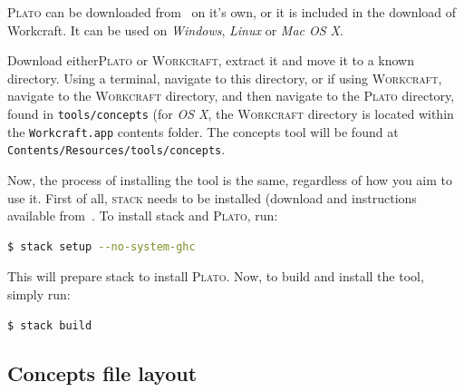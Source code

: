\documentclass[british,conference,compsoc]{IEEEtran}
\newcommand{\noun}[1]{\textsc{#1}}
\begin{document}
\noun{Plato} can be downloaded from~\cite{2016_concepts_github} on it's
own, or it is included in the download of Workcraft. It can be used on 
\emph{Windows}, \emph{Linux} or \emph{Mac OS X}.

Download either\noun{Plato} or \noun{Workcraft}, extract it and move it to
a known directory. Using a terminal, navigate to this directory,
or if using \noun{Workcraft}, navigate to the \noun{Workcraft} directory, and
then navigate to the \noun{Plato} directory, found in \texttt{tools/concepts} 
(for \emph{OS X}, the \noun{Workcraft} directory is located within the 
\texttt{Workcraft.app} contents folder. The concepts tool will be found at 
\texttt{Contents/Resources/tools/concepts}.

Now, the process of installing the tool is the same, regardless of how you aim 
to use it. First of all, \noun{stack} needs to be installed 
(download and instructions available from~\cite{stack_website}. 
To install stack and \noun{Plato}, run: 

\vspace{-2mm}

\begin{lstlisting}[language=bash]
  $ stack setup --no-system-ghc
\end{lstlisting}

\vspace{-1mm}

This will prepare stack to install \noun{Plato}. Now, to build and install
the tool, simply run:

\vspace{-1mm}

\begin{lstlisting}[language=bash]
  $ stack build
\end{lstlisting}

\vspace{-5mm}

\subsection{Concepts file layout \label{sub:file_layout}}

\vspace{-5mm}
\end{document}

